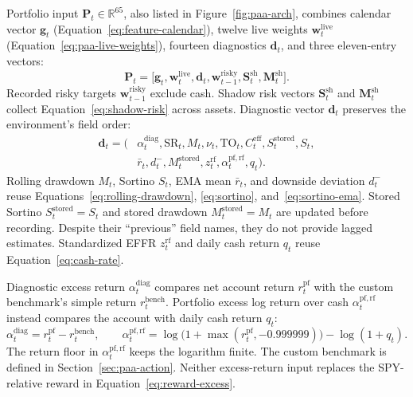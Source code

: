 Portfolio input \(\mathbf P_t\in\mathbb R^{65}\), also listed in Figure~\ref{fig:paa-arch}, combines calendar vector \(\mathbf g_t\) (Equation~\eqref{eq:feature-calendar}), twelve live weights \(\mathbf w_t^{\mathrm{live}}\) (Equation~\eqref{eq:paa-live-weights}), fourteen diagnostics \(\mathbf d_t\), and three eleven-entry vectors:
\begin{equation}
\mathbf P_t=
\big[\mathbf g_t,\mathbf w_t^{\mathrm{live}},\mathbf d_t,
\mathbf w_{t-1}^{\mathrm{risky}},\mathbf S_t^{\mathrm{sh}},\mathbf M_t^{\mathrm{sh}}\big].
\label{eq:paa-portfolio-inputs}
\end{equation}
Recorded risky targets \(\mathbf w_{t-1}^{\mathrm{risky}}\) exclude cash. Shadow risk vectors \(\mathbf S_t^{\mathrm{sh}}\) and \(\mathbf M_t^{\mathrm{sh}}\) collect Equation~\eqref{eq:shadow-risk} across assets. Diagnostic vector \(\mathbf d_t\) preserves the environment's field order:
\begin{equation}
\begin{aligned}
\mathbf d_t=\big(&\alpha_t^{\mathrm{diag}},\mathrm{SR}_t,M_t,\nu_t,\mathrm{TO}_t,C_t^{\mathrm{eff}},
S_t^{\mathrm{stored}},S_t,\\
&\bar r_t,d_t^-,M_t^{\mathrm{stored}},z_t^{\mathrm{rf}},
\alpha_t^{\mathrm{pf,rf}},q_t\big).
\end{aligned}
\label{eq:paa-diagnostics}
\end{equation}
Rolling drawdown \(M_t\), Sortino \(S_t\), EMA mean \(\bar r_t\), and downside deviation \(d_t^-\) reuse Equations~\eqref{eq:rolling-drawdown}, \eqref{eq:sortino}, and~\eqref{eq:sortino-ema}. Stored Sortino \(S_t^{\mathrm{stored}}=S_t\) and stored drawdown \(M_t^{\mathrm{stored}}=M_t\) are updated before recording. Despite their ``previous'' field names, they do not provide lagged estimates. Standardized EFFR \(z_t^{\mathrm{rf}}\) and daily cash return \(q_t\) reuse Equation~\eqref{eq:cash-rate}.

Diagnostic excess return \(\alpha_t^{\mathrm{diag}}\) compares net account return \(r_t^{\mathrm{pf}}\) with the custom benchmark's simple return \(r_t^{\mathrm{bench}}\). Portfolio excess log return over cash \(\alpha_t^{\mathrm{pf,rf}}\) instead compares the account with daily cash return \(q_t\):
\begin{equation}
\alpha_t^{\mathrm{diag}}=r_t^{\mathrm{pf}}-r_t^{\mathrm{bench}},\qquad
\alpha_t^{\mathrm{pf,rf}}=
\log\!\big(1+\max(r_t^{\mathrm{pf}},-0.999999)\big)-\log(1+q_t).
\label{eq:paa-return-diagnostics}
\end{equation}
The return floor in \(\alpha_t^{\mathrm{pf,rf}}\) keeps the logarithm finite. The custom benchmark is defined in Section~\ref{sec:paa-action}. Neither excess-return input replaces the SPY-relative reward in Equation~\eqref{eq:reward-excess}.

